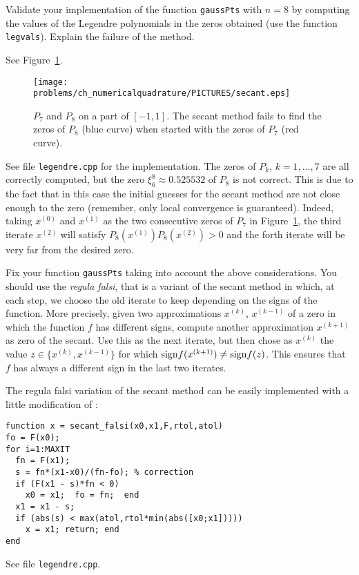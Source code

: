 \begin{problem}
\begin{subproblem}[2]
Validate your implementation of the function \texttt{gaussPts} with $n=8$ by computing the values of the Legendre polynomials in the zeros obtained (use the function \texttt{legvals}). Explain the failure of the method.
\begin{hint}
See Figure~\ref{fig:secant}.
\begin{figure}[hbt]
\hspace{8mm}
\texttt{[image: \\problems/ch\_numericalquadrature/PICTURES/secant.eps]}
\caption{$P_7$ and $P_8$ on a part of $[-1,1]$. The secant method fails to find the zeros of $P_8$ (blue curve) when started with the zeros of $P_7$ (red curve).}
\label{fig:secant}
\end{figure}
\end{hint}
\begin{solution}
See file \texttt{legendre.cpp} for the implementation. The zeros of $P_k$, $k=1,\dots,7$ are all correctly computed, but the zero $\xi^8_6\approx 0.525532$ of $P_8$ is not correct. This is due to the fact that in this case the initial guesses for the secant method are not close enough to the zero (remember, only local convergence is guaranteed). Indeed, taking $x^{(0)}$ and $x^{(1)}$ as the two consecutive zeros of $P_7$ in Figure~\ref{fig:secant}, the third iterate $x^{(2)}$ will satisfy $P_8(x^{(1)})P_8(x^{(2)})>0$ and the forth iterate will be very far from the desired zero.
\end{solution}
\end{subproblem}

\begin{subproblem}[2]
Fix your function \texttt{gaussPts} taking into account the above considerations. You should use the \emph{regula falsi}, that is a variant of the secant method in which, at each step, we choose the old iterate to keep depending on the signs of the function. More precisely, given two approximations $x^{(k)}$, $x^{(k-1)}$ of a zero in which the function $f$ has different signs, compute another approximation $x^{(k+1)}$ as zero of the secant. Use this as the next iterate, but then chose as $x^{(k)}$ the value $z \in \{ x^{(k)} ,x^{(k-1)}\}$ for which $ {\rm sign} f(x^{(k+1)}) \neq {\rm sign} f(z)$. This ensures that $f$ has always a different sign in the last two iterates.
\begin{hint}
The regula falsi variation of the secant method can be easily implemented with a little modification of :
\begin{lstlisting}
function x = secant_falsi(x0,x1,F,rtol,atol)
fo = F(x0);
for i=1:MAXIT
  fn = F(x1);
  s = fn*(x1-x0)/(fn-fo); % correction
  if (F(x1 - s)*fn < 0)
    x0 = x1;  fo = fn;  end
  x1 = x1 - s;
  if (abs(s) < max(atol,rtol*min(abs([x0;x1]))))
    x = x1; return; end
end  
  \end{lstlisting}
\end{hint}
\begin{solution}
See file \texttt{legendre.cpp}.
\end{solution}
\end{subproblem}

\end{problem}





